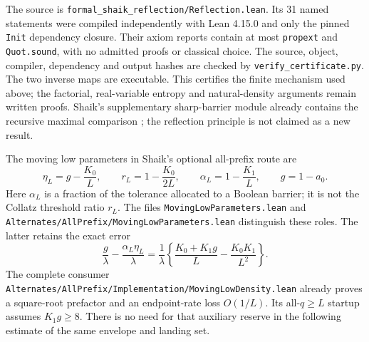 \documentclass[11pt]{article}
\theoremstyle{remark}\newtheorem{remark}[proposition]{Remark}
\begin{document}
The source is \texttt{formal\_shaik\_reflection/Reflection.lean}.
Its 31 named statements were compiled independently with Lean 4.15.0
and only the pinned \texttt{Init} dependency closure. Their axiom
reports contain at most \texttt{propext} and \texttt{Quot.sound},
with no admitted proofs or classical choice. The source, object,
compiler, dependency and output hashes are checked by
\texttt{verify\_certificate.py}. The two inverse maps are executable.
This certifies the finite mechanism used above; the factorial,
real-variable entropy and natural-density arguments remain written
proofs. Shaik's supplementary sharp-barrier module already contains
the recursive maximal comparison \cite{Shaik2026v324}; the reflection
principle is not claimed as a new result.

The moving low parameters in Shaik's optional all-prefix route are
\[
 \eta_L=g-\frac{K_0}{L},\qquad
 r_L=1-\frac{K_0}{2L},\qquad
 \alpha_L=1-\frac{K_1}{L},\qquad g=1-a_0.
\]
Here \(\alpha_L\) is a fraction of the tolerance allocated to a
Boolean barrier; it is not the Collatz threshold ratio \(r_L\).
The files \texttt{MovingLowParameters.lean} and
\texttt{Alternates/AllPrefix/MovingLowParameters.lean} distinguish these
roles. The latter retains the exact error
\[
 \frac g\lambda-\frac{\alpha_L\eta_L}{\lambda}
 =\frac1\lambda\left\{\frac{K_0+K_1g}{L}
                         -\frac{K_0K_1}{L^2}\right\}.
\]
The complete consumer
\texttt{Alternates/AllPrefix/Implementation/MovingLowDensity.lean}
already proves a square-root prefactor and an endpoint-rate loss
\(O(1/L)\). Its all-\(q\ge L\) startup assumes \(K_1g\ge8\).
There is no need for that auxiliary reserve in the following
estimate of the same envelope and landing set.
\end{document}
